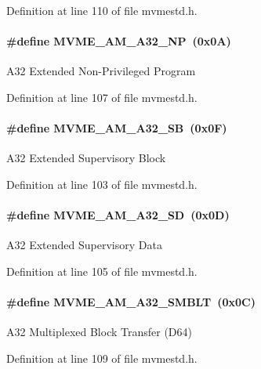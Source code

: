Definition at line 110 of file mvmestd.h.
\paragraph[{MVME\_\-AM\_\-A32\_\-NP}]{\setlength{\rightskip}{0pt plus 5cm}\#define MVME\_\-AM\_\-A32\_\-NP~(0x0A)}\hfill\label{group__mvmestdinclude_ga2ad16250f1ba34f2990d8a88e62beb24}
A32 Extended Non-\/Privileged Program 

Definition at line 107 of file mvmestd.h.
\paragraph[{MVME\_\-AM\_\-A32\_\-SB}]{\setlength{\rightskip}{0pt plus 5cm}\#define MVME\_\-AM\_\-A32\_\-SB~(0x0F)}\hfill\label{group__mvmestdinclude_ga8e19f6f8b7c77ba0700df4c8b4980163}
A32 Extended Supervisory Block 

Definition at line 103 of file mvmestd.h.
\paragraph[{MVME\_\-AM\_\-A32\_\-SD}]{\setlength{\rightskip}{0pt plus 5cm}\#define MVME\_\-AM\_\-A32\_\-SD~(0x0D)}\hfill\label{group__mvmestdinclude_gac37a7339f5a193bdf0265f49aedb4696}
A32 Extended Supervisory Data 

Definition at line 105 of file mvmestd.h.
\paragraph[{MVME\_\-AM\_\-A32\_\-SMBLT}]{\setlength{\rightskip}{0pt plus 5cm}\#define MVME\_\-AM\_\-A32\_\-SMBLT~(0x0C)}\hfill\label{group__mvmestdinclude_gac536941f770602aece8422c1116dc1bd}
A32 Multiplexed Block Transfer (D64) 

Definition at line 109 of file mvmestd.h.
